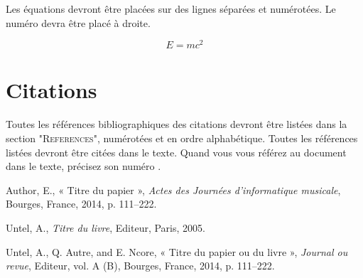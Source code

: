 \documentclass{article}
\begin{document}
Les équations devront être placées sur des lignes séparées et numérotées. Le numéro devra être placé à droite.

\begin{equation}
E=mc^{2}
\end{equation}

\section{Citations}

Toutes les références bibliographiques des citations devront être listées dans la section "\textsc{References}", numérotées et en ordre alphabétique. Toutes les références  listées devront être citées dans le texte. Quand  vous vous référez au document dans le texte, précisez son numéro \cite{Author:00}.

\begin{thebibliography}{2}

 Author, E.,
« Titre du papier »,
{\it Actes des Journées d’informatique musicale}, 
Bourges, France, 2014, p. 111--222.

 Untel, A.,
{\it  Titre du livre},
Editeur, Paris, 2005.

 Untel, A., Q. Autre, and E. Ncore, 
« Titre du papier ou du livre »,
{\it Journal ou revue}, 
Editeur, vol. A (B), Bourges, France, 2014, p. 111--222.

\end{thebibliography}
\end{document}
